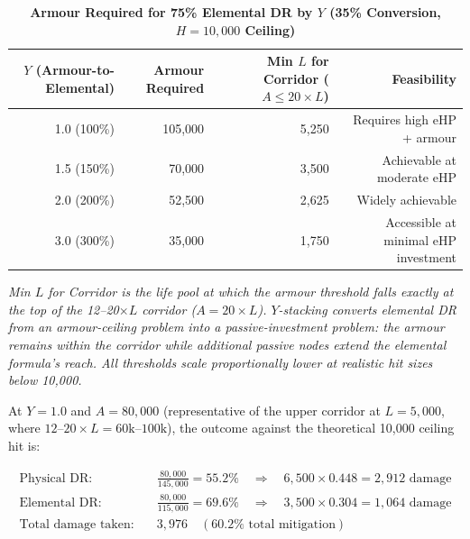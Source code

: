 \documentclass[12pt, letterpaper]{article}
\begin{document}
\begin{table}[htbp]
\centering
\caption{\textbf{Armour Required for 75\% Elemental DR by $Y$ (35\% Conversion, $H = 10{,}000$ Ceiling)}}
\begin{tabular}{rrrr}
\toprule
\textbf{$Y$ (Armour-to-Elemental)} & \textbf{Armour Required} & \textbf{Min $L$ for Corridor ($A \leq 20 \times L$)} & \textbf{Feasibility} \\
\midrule
\rowcolor{rowalt} 1.0 (100\%) & 105{,}000 & 5{,}250 & Requires high eHP + armour \\
1.5 (150\%) & 70{,}000 & 3{,}500 & Achievable at moderate eHP \\
\rowcolor{rowalt} 2.0 (200\%) & 52{,}500 & 2{,}625 & Widely achievable \\
3.0 (300\%) & 35{,}000 & 1{,}750 & Accessible at minimal eHP investment \\
\bottomrule
\end{tabular}
\smallskip
\begin{minipage}{\linewidth}
\small\textit{Min $L$ for Corridor is the life pool at which the armour threshold falls exactly at the top of the 12--20$\times L$ corridor ($A = 20 \times L$). $Y$-stacking converts elemental DR from an armour-ceiling problem into a passive-investment problem: the armour remains within the corridor while additional passive nodes extend the elemental formula's reach. All thresholds scale proportionally lower at realistic hit sizes below 10{,}000.}
\end{minipage}
\end{table}

At $Y = 1.0$ and $A = 80{,}000$ (representative of the upper corridor at $L = 5{,}000$, where $12\text{--}20 \times L = 60\text{k--}100\text{k}$), the outcome against the theoretical 10{,}000 ceiling hit is:

\begin{align*}
\text{Physical DR:} \quad &\frac{80{,}000}{145{,}000} = 55.2\% \quad \Rightarrow \quad 6{,}500 \times 0.448 = 2{,}912 \text{ damage} \\
\text{Elemental DR:} \quad &\frac{80{,}000}{115{,}000} = 69.6\% \quad \Rightarrow \quad 3{,}500 \times 0.304 = 1{,}064 \text{ damage} \\
\text{Total damage taken:} \quad &3{,}976 \quad (60.2\%\text{ total mitigation})
\end{align*}
\end{document}
